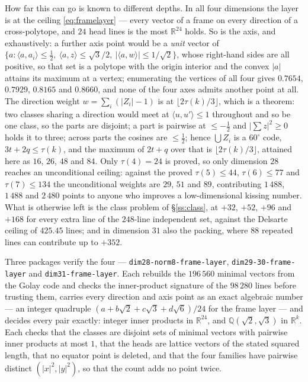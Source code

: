 \documentclass[11pt]{amsart}
\theoremstyle{remark}
\newcommand{\ip}[2]{\langle #1,#2\rangle}
\newcommand{\R}{\mathbb{R}}
\newcommand{\Q}{\mathbb{Q}}
\begin{document}
How far this can go is known to different depths. In all four dimensions the
layer is at the ceiling \eqref{eq:framelayer} --- every vector of a frame on
every direction of a cross-polytope, and $24$ head lines is the most $\R^{24}$
holds. So is the axis, and exhaustively: a further axis point would be a
\emph{unit} vector of $\{a:\ip{a}{a_{i}}\le\tfrac12,\ \ip{a}{z}\le\sqrt3/2,\
|\ip{a}{w}|\le1/\sqrt2\}$, whose right-hand sides are all positive, so that set
is a polytope with the origin interior and the convex $|a|$ attains its maximum
at a vertex; enumerating the vertices of all four gives $0.7654$, $0.7929$,
$0.8165$ and $0.8660$, and none of the four axes admits another point at all.
The direction weight $w=\sum_{i}(|Z_{i}|-1)$ is at $\lfloor2\tau(k)/3\rfloor$,
which is a theorem: two classes sharing a direction would meet at
$\ip{u}{u'}\le1$ throughout and so be one class, so the parts are disjoint; a
part is pairwise at $\le-\tfrac12$ and $|\sum z|^{2}\ge0$ holds it to three;
across parts the cosines are $\le\tfrac12$; hence $\bigcup Z_{i}$ is a
$60^{\circ}$ code, $3t+2q\le\tau(k)$, and the maximum of $2t+q$ over that is
$\lfloor2\tau(k)/3\rfloor$, attained here as $16$, $26$, $48$ and $84$. Only
$\tau(4)=24$ is proved, so only dimension $28$ reaches an unconditional ceiling:
against the proved $\tau(5)\le44$, $\tau(6)\le77$ and $\tau(7)\le134$ the
unconditional weights are $29$, $51$ and $89$, contributing $1\,488$, $1\,488$ and
$2\,480$ points to anyone who improves a low-dimensional kissing number. What is
otherwise left is the class problem of \S\ref{ss:class}, at $+32$, $+52$, $+96$
and $+168$ for every extra line of the $248$-line independent set, against the
Delsarte ceiling of $425.45$ lines; and in dimension $31$ also the packing,
where $88$ repeated lines can contribute up to $+352$.

\begin{sloppypar}
Three packages verify the four --- \texttt{dim28-norm8-frame-layer},
\texttt{dim29-30-frame-layer} and \texttt{dim31-frame-layer}. Each rebuilds the
$196\,560$ minimal vectors from the Golay code and checks the inner-product
signature of the $98\,280$ lines before trusting them, carries every direction
and axis point as an exact algebraic number --- an integer quadruple
$(a+b\sqrt2+c\sqrt3+d\sqrt6)/24$ for the frame layer --- and decides every pair
exactly: integer inner products in $\R^{24}$, and $\Q(\sqrt2,\sqrt3)$ in
$\R^{k}$. Each
checks that the classes are disjoint sets of minimal vectors with pairwise inner
products at most $1$, that the heads are lattice vectors of the stated squared
length, that no equator point is deleted, and that the four families have
pairwise distinct $(|x|^{2},|y|^{2})$, so that the count adds no point twice.
\end{sloppypar}
\end{document}

